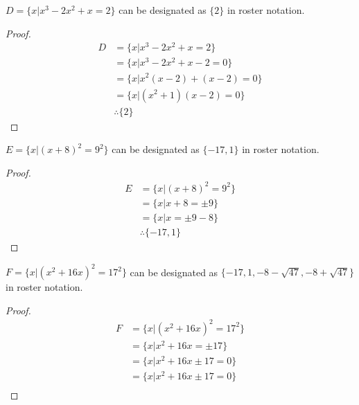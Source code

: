 \begin{enumerate}
  \begin{proposition}
    $D = \{x | x^3 - 2x^2 + x = 2\}$ can be designated as $\{2\}$ in roster notation.
  \end{proposition}
  \begin{proof}
    \begin{equation}
      \begin{split}
        D & = \{x | x^3 - 2x^2 + x = 2\} \\
        & = \{x | x^3 - 2x^2 + x - 2 = 0 \} \\
        & = \{x | x^2(x - 2) + (x - 2) = 0 \} \\
        & = \{x | (x^2 + 1)(x - 2) = 0 \} \\
        & \therefore \{2\}
      \end{split}
    \end{equation}
  \end{proof}

  \begin{proposition}
    $E = \{x | (x + 8)^2 = 9^2 \}$ can be designated as $\{-17, 1\}$ in roster notation.
  \end{proposition}
  \begin{proof}
    \begin{equation}
      \begin{split}
        E & = \{x | (x + 8)^2 = 9^2 \} \\
        & = \{x | x + 8 = \pm{9} \} \\
        & = \{x | x = \pm{9} - 8 \} \\
        & \therefore \{-17, 1\}
      \end{split}
    \end{equation}
  \end{proof}

  \begin{proposition}
    $F = \{x | (x^2 + 16x)^2 = 17^2 \}$ can be designated as $\{-17, 1, -8 - \sqrt{47}, -8 + \sqrt{47}\}$ in roster notation.
  \end{proposition}
  \begin{proof}
    \begin{equation}
      \label{eq:some_nontrivial_root}
      \begin{split}
        F & = \{x | (x^2 + 16x)^2 = 17^2 \} \\
        & = \{x | x^2 + 16x = \pm{17} \} \\
        & = \{x | x^2 + 16x \pm{17} = 0 \} \\
        & = \{x | x^2 + 16x \pm{17} = 0 \} \\
      \end{split}
    \end{equation}
    

\end{proof}
\end{enumerate}
